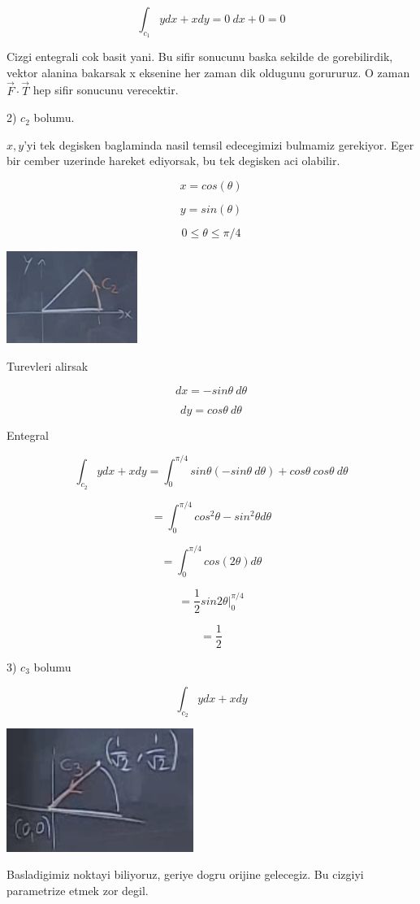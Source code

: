 \documentclass[12pt,fleqn]{article}
\begin{document}
\[ \int_{c_1} y dx + x dy = 0 \ dx + 0 = 0\]

Cizgi entegrali cok basit yani. Bu sifir sonucunu baska sekilde de
gorebilirdik, vektor alanina bakarsak x eksenine her zaman dik oldugunu
gorururuz. O zaman $\vec{F}\cdot \vec{T}$ hep sifir sonucunu verecektir. 

2) $c_2$ bolumu. 

$x,y$'yi tek degisken baglaminda nasil temsil edecegimizi bulmamiz
gerekiyor. Eger bir cember uzerinde hareket ediyorsak, bu tek degisken aci
olabilir. 

\[ x = cos(\theta) \]

\[ y = sin(\theta) \]

\[ 0 \le \theta \le \pi / 4 \]

\includegraphics[height=3cm]{20_3.png}

Turevleri alirsak

\[ dx = -sin\theta \ d\theta\]

\[ dy = cos\theta \ d\theta \]

Entegral

\[ \int_{c_2} y dx + x dy = 
\int_0^{\pi/4} sin\theta (-sin\theta \ d\theta)  + 
cos\theta \ cos\theta \ d\theta
\]

\[ = \int_0^{\pi/4} cos^2\theta - sin^2\theta d\theta \]

\[ = \int_0^{\pi/4} cos(2\theta) d\theta \]

\[ = \frac{1}{2}sin2\theta \bigg|_0^{\pi/4} \]

\[ = \frac{1}{2} \]

3) $c_3$ bolumu

\[ \int_{c_2} y dx + x dy \]

\includegraphics[height=4cm]{20_4.png}

Basladigimiz noktayi biliyoruz, geriye dogru orijine gelecegiz. Bu cizgiyi
parametrize etmek zor degil. 
\end{document}
